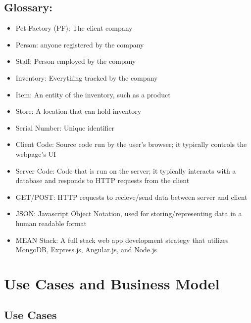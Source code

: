 \documentclass[letterpaper, 12pt]{article}
\begin{document}
\subsection{Glossary:}
%
%
\begin{itemize}
\item Pet Factory (PF): The client company
\item Person: anyone registered by the company
\item Staff: Person employed by the company
\item Inventory: Everything tracked by the company
\item Item: An entity of the inventory, such as a product
\item Store: A location that can hold inventory
\item Serial Number: Unique identifier
\item Client Code: Source code run by the user's browser; it typically controls the webpage's UI
\item Server Code: Code that is run on the server; it typically interacts with a database and responds to HTTP requests from the client
\item GET/POST: HTTP requests to recieve/send data between server and client
\item JSON: Javascript Object Notation, used for storing/representing data in a human readable format
\item MEAN Stack: A full stack web app development strategy that utilizes MongoDB, Express.js, Angular.js, and Node.js

\end{itemize}

\section{Use Cases and Business Model}

\subsection{Use Cases}
\end{document}
